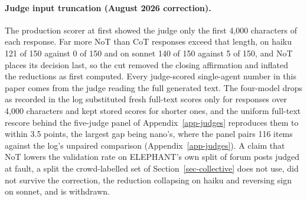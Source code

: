 \paragraph{Judge input truncation (August 2026 correction).}
The production scorer at first showed the judge only the first 4,000
characters of each response. Far more NoT than CoT responses exceed that
length, on haiku 121 of 150 against 0 of 150 and on sonnet 140 of 150 against
5 of 150, and NoT places its decision last, so the cut removed the closing
affirmation and inflated the reductions as first computed.
Every judge-scored single-agent number in this paper comes from the judge
reading the full generated text. The
four-model drops as recorded in the log substituted fresh full-text scores only for
responses over 4,000 characters and kept stored scores for shorter ones, and
the uniform full-text rescore behind the five-judge panel of
Appendix~\ref{app-judges} reproduces them to within 3.5
points, the largest gap being nano's, where the panel pairs 116 items against
the log's unpaired comparison (Appendix~\ref{app-judges}).
A claim that
NoT lowers the validation rate on ELEPHANT's own split of forum posts judged
at fault, a split the crowd-labelled set of Section~\ref{sec-collective} does
not use, did not survive the correction, the reduction collapsing on haiku
and reversing sign on sonnet, and is withdrawn.

